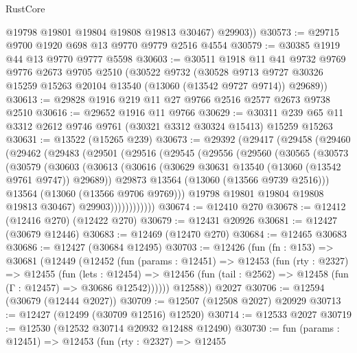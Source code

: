 \begin{lexlean}{RustCore}
\begin{coremodule}
          @19798
          @19801
          @19804
          @19808
          @19813
          @30467)
        @29903))
@30573 := @29715 @9700 @1920 @698 @13 @9770 @9779 @2516 @4554
@30579 := @30385 @1919 @44 @13 @9770 @9777 @5598
@30603 := @30511
    @1918
    @11
    @41
    @9732
    @9769
    @9776
    @2673
    @9705
    @2510
    (@30522
      @9732
      (@30528 @9713 @9727 @30326 @15259 @15263 @20104 @13540 (@13060 (@13542 @9727 @9714)) @29689))
@30613 := @29828 @1916 @219 @11 @27 @9766 @2516 @2577 @2673 @9738 @2510
@30616 := @29652 @1916 @11 @9766
@30629 := @30311 @239 @65 @11 @3312 @2612 @9746 @9761 (@30321 @3312 @30324 @15413) @15259 @15263
@30631 := @13522 (@15265 @239)
@30673 := @29392
    (@29417
      (@29458
        (@29460
          (@29462
            (@29483
              (@29501
                (@29516
                  (@29545
                    (@29556
                      (@29560
                        (@30565
                          (@30573
                            (@30579
                              (@30603
                                (@30613
                                  (@30616
                                    (@30629 @30631 @13540 (@13060 (@13542 @9761 @9747)) @29689))
                                  @29873
                                  @13564
                                  (@13060 (@13566 @9739 @2516)))
                                @13564
                                (@13060 (@13566 @9706 @9769)))
                              @19798
                              @19801
                              @19804
                              @19808
                              @19813
                              @30467)
                            @29903))))))))))))
@30674 := @12410 @270
@30678 := @12412 (@12416 @270) (@12422 @270)
@30679 := @12431 @20926
@30681 := @12427 (@30679 @12446)
@30683 := @12469 (@12470 @270)
@30684 := @12465 @30683
@30686 := @12427 (@30684 @12495)
@30703 := @12426
    (fun (fn : @153) =>
    @30681
      (@12449
        (@12452
          (fun (params : @12451) =>
          @12453
            (fun (rty : @2327) =>
            @12455
              (fun (lets : @12454) =>
              @12456 (fun (tail : @2562) => @12458 (fun (Γ : @12457) => @30686 @12542))))))
        @12588))
    @2027
@30706 := @12594 (@30679 (@12444 @2027))
@30709 := @12507 (@12508 @2027) @20929
@30713 := @12427 (@12499 (@30709 @12516) @12520)
@30714 := @12533 @2027
@30719 := @12530 (@12532 @30714 @20932 @12488 @12490)
@30730 := fun (params : @12451) =>
  @12453
    (fun (rty : @2327) =>
    @12455

\end{coremodule}
\end{lexlean}
